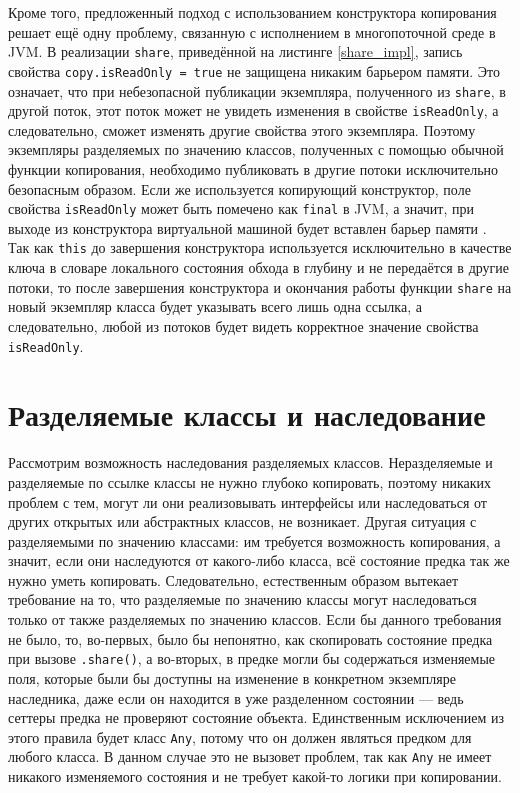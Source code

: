 \documentclass[specification,annotation,times]{itmo-student-thesis}
\newcommand{\todo}[1]{\textbf{TODO}} %
\begin{document}
Кроме того, предложенный подход с использованием конструктора копирования решает ещё одну проблему, связанную с исполнением в многопоточной среде в JVM.
В реализации \texttt{share}, приведённой на листинге \ref{share_impl}, запись свойства \texttt{copy.isReadOnly = true} не защищена никаким барьером памяти.
Это означает, что при небезопасной публикации экземпляра, полученного из \texttt{share}, в другой поток, этот поток может не увидеть изменения в свойстве \texttt{isReadOnly}, а следовательно, сможет изменять другие свойства этого экземпляра.
Поэтому экземпляры разделяемых по значению классов, полученных с помощью обычной функции копирования, необходимо публиковать в другие потоки исключительно безопасным образом.
Если же используется копирующий конструктор, поле свойства \texttt{isReadOnly} может быть помечено как \texttt{final} в JVM, а значит,
при выходе из конструктора виртуальной машиной будет вставлен барьер памяти \cite{shipilev-final}.
Так как \texttt{this} до завершения конструктора используется исключительно в качестве ключа в словаре локального состояния обхода в глубину и не передаётся в другие потоки, то после завершения конструктора и окончания работы функции \texttt{share} на новый экземпляр класса будет указывать всего лишь одна ссылка, а следовательно, любой из потоков будет видеть корректное значение свойства \texttt{isReadOnly}.
%



\section{Разделяемые классы и наследование}\label{inheritance}

Рассмотрим возможность наследования разделяемых классов.
Неразделяемые и разделяемые по ссылке классы не нужно глубоко копировать, поэтому никаких проблем с тем, могут ли они реализовывать интерфейсы или наследоваться от других открытых или абстрактных классов, не возникает.
Другая ситуация с разделяемыми по значению классами: им требуется возможность копирования, а значит, если они наследуются от какого-либо класса, всё состояние предка так же нужно уметь копировать.
Следовательно, естественным образом вытекает требование на то, что разделяемые по значению классы могут наследоваться только от также разделяемых по значению классов.
Если бы данного требования не было, то, во-первых, было бы непонятно, как скопировать состояние предка при вызове \texttt{.share()}, а во-вторых, в предке могли бы содержаться изменяемые поля, которые были бы доступны на изменение в конкретном экземпляре наследника, даже если он находится в уже разделенном состоянии --- ведь сеттеры предка не проверяют состояние объекта.
Единственным исключением из этого правила будет класс \texttt{Any}, потому что он должен являться предком для любого класса. В данном случае это не вызовет проблем, так как \texttt{Any} не имеет никакого изменяемого состояния и не требует какой-то логики при копировании.
\end{document}
